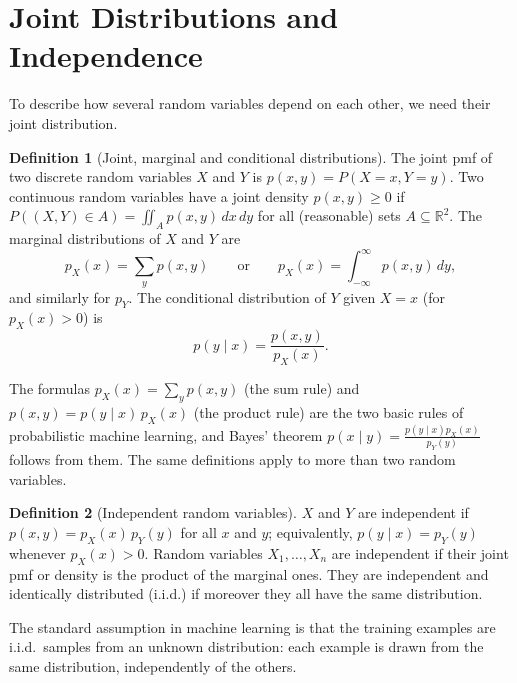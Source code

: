\documentclass[11pt]{article}
\theoremstyle{definition}
\newtheorem{definition}{Definition}[section]
\theoremstyle{plain}
\theoremstyle{remark}
\begin{document}
\section{Joint Distributions and Independence}\label{sec:joint}

To describe how several random variables depend on each other, we need their joint distribution.

\begin{definition}[Joint, marginal and conditional distributions]\label{def:joint}
    The joint pmf of two discrete random variables $X$ and $Y$ is $p(x, y) = P(X = x, Y = y)$. Two continuous random variables have a joint density $p(x, y) \geq 0$ if $P((X, Y) \in A) = \iint_A p(x, y) \, dx \, dy$ for all (reasonable) sets $A \subseteq \mathbb{R}^2$. The marginal distributions of $X$ and $Y$ are
    \[p_X(x) = \sum_y p(x, y) \qquad \text{or} \qquad p_X(x) = \int_{-\infty}^\infty p(x, y) \, dy,\]
    and similarly for $p_Y$. The conditional distribution of $Y$ given $X = x$ (for $p_X(x) > 0$) is
    \[p(y \mid x) = \frac{p(x, y)}{p_X(x)}.\]
\end{definition}

The formulas $p_X(x) = \sum_y p(x, y)$ (the sum rule) and $p(x, y) = p(y \mid x)\,p_X(x)$ (the product rule) are the two basic rules of probabilistic machine learning, and Bayes' theorem $p(x \mid y) = \frac{p(y \mid x)p_X(x)}{p_Y(y)}$ follows from them. The same definitions apply to more than two random variables.

\begin{definition}[Independent random variables]\label{def:independent-rv}
    $X$ and $Y$ are independent if $p(x, y) = p_X(x)\,p_Y(y)$ for all $x$ and $y$; equivalently, $p(y \mid x) = p_Y(y)$ whenever $p_X(x) > 0$. Random variables $X_1, \ldots, X_n$ are independent if their joint pmf or density is the product of the marginal ones. They are independent and identically distributed (i.i.d.) if moreover they all have the same distribution.
\end{definition}

The standard assumption in machine learning is that the training examples are i.i.d.\ samples from an unknown distribution: each example is drawn from the same distribution, independently of the others.
\end{document}
